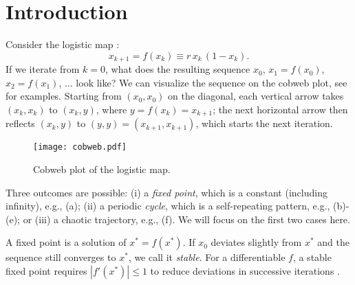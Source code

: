 \documentclass{ws-ijbc}
\begin{document}




%
%
\section{Introduction}
%
%

Consider the logistic map \cite{may, strogatz}:
%
\begin{equation}
  x_{k+1} = f(x_k) \equiv r \, x_k \, ( 1 - x_k ).
\label{eq:logmap}
\end{equation}
%
If we iterate  from $k = 0$,
what does the resulting sequence $x_0$,
  $x_1 = f(x_0)$,
  $x_2 = f(x_1)$, $\ldots$ look like?
%
%
%
We can visualize the sequence on the cobweb plot,
  see  for examples.
%
Starting from $(x_0, x_0)$ on the diagonal,
  each vertical arrow takes $(x_k, x_k)$ to $(x_k, y)$,
  where $y = f(x_k) = x_{k+1}$;
the next horizontal arrow then reflects $(x_k, y)$ to
  $(y, y) = (x_{k+1}, x_{k+1})$,
  which starts the next iteration.

\begin{figure}[h]
  \begin{minipage}{\linewidth}
    \begin{center}
        \texttt{[image: cobweb.pdf]}
    \end{center}
  \end{minipage}%
  \caption{\label{fig:cobweb}
  Cobweb plot of the logistic map.}
\end{figure}


Three outcomes are possible:
  (i) a \emph{fixed point},
      which is a constant (including infinity),
      e.g., (a);
  (ii) a periodic \emph{cycle},
      which is a self-repeating pattern,
      e.g., (b)-(e);
or
  (iii) a chaotic trajectory,
      e.g., (f).
We will focus on the first two cases here.


A fixed point is a solution of $x^* = f(x^*)$.
%
If $x_0$ deviates slightly from $x^*$
  and the sequence still converges to $x^*$,
  we call it \emph{stable}.
%
For a differentiable $f$,
  a stable fixed point requires $|f'(x^*)| \le 1$
  to reduce deviations in successive iterations \cite{strogatz}.
\end{document}
